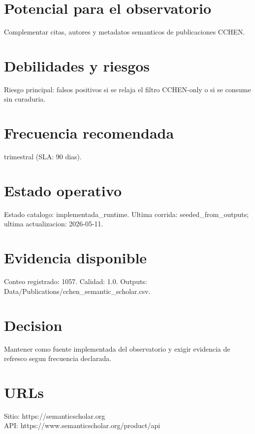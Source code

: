 \documentclass[10pt,a4paper]{article}
\begin{document}
\section*{Potencial para el observatorio}
Complementar citas, autores y metadatos semanticos de publicaciones CCHEN.

\section*{Debilidades y riesgos}
Riesgo principal: falsos positivos si se relaja el filtro CCHEN-only o si se consume sin curaduria.

\section*{Frecuencia recomendada}
trimestral (SLA: 90 dias).

\section*{Estado operativo}
Estado catalogo: implementada\_runtime. Ultima corrida: seeded\_from\_outputs; ultima actualizacion: 2026-05-11.

\section*{Evidencia disponible}
Conteo registrado: 1057. Calidad: 1.0. Outputs: Data/Publications/cchen\_semantic\_scholar.csv.

\section*{Decision}
Mantener como fuente implementada del observatorio y exigir evidencia de refresco segun frecuencia declarada.


\section*{URLs}
Sitio: https://semanticscholar.org\\
API: https://www.semanticscholar.org/product/api
\end{document}
